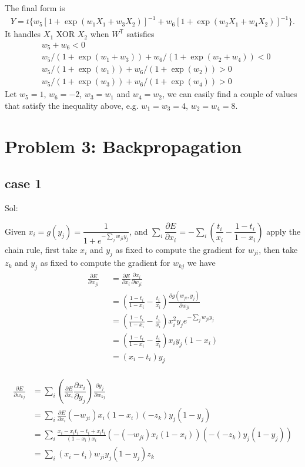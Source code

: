 \documentclass[a4paper,12pt]{article}
\begin{document}
The final form is 
\begin{align}
Y = t\{ w_5\left[1 + \exp(w_1 X_1 + w_3 X_2)\right]^{-1} + w_6\left[1 + \exp(w_2 X_1 + w_4 X_2)\right]^{-1} \}.  \nonumber
\end{align}
It handles $X_1$ XOR $X_2$ when $W^{\mathsf{T}}$ satisfies 
\begin{align}
&w_5+w_6 < 0 \\
&w_5 / (1+ \exp(w_1 + w_3)) + w_6 / (1+ \exp(w_2+ w_4)) < 0 \\
&w_5 / (1+ \exp(w_1 )) + w_6 / (1+ \exp(w_2))> 0 \\
&w_5 / (1+ \exp(w_3 )) + w_6 / (1+ \exp(w_4))> 0 
\end{align}
Let $w_5 = 1 $, $w_6 = -2$, $w_3 = w_1$ and $w_4 = w_2$, we can easily find a couple of values that satisfy the inequality above, e.g. $w_1 = w_3 = 4$, $w_2 = w_4 = 8$.

\section{Problem 3: Backpropagation}

\subsection{case 1}

Sol: 

Given $x_i = g(y_j) = \dfrac{1}{1+e^{-\sum_j {w_{ji}y_j}}}$, and $\sum_{i}\dfrac{\partial E}{\partial x_i} = -\sum_i {(\dfrac{t_i}{x_i} - \dfrac{1 - t_i}{1 - x_i})}$ apply the chain rule, first take $x_i$ and $y_j$ as fixed to compute the gradient for $w_{ji}$, then take $z_k$ and $y_j$ as fixed to compute the gradient for $w_{kj}$ we have 
\begin{align}
\frac{\partial E}{\partial w_{ji}} & = \frac{\partial E}{\partial x_i}\frac{\partial x_i}{\partial w_{ji}}\nonumber \\
&= (\frac{1-t_i}{1- x_i} - \frac{t_i}{x_i})\frac{\partial g(w_{ji}, y_j) }{\partial w_{ji}} \nonumber \\
& = (\frac{1-t_i}{1- x_i} - \frac{t_i}{x_i}) x^2_i y_{j} e^{-\sum_j{w_{ji}y_j}} \nonumber \\
& = (\frac{1-t_i}{1- x_i} - \frac{t_i}{x_i}) x_i y_{j} (1-x_i) \nonumber \\
& = (x_i - t_i) y_j \nonumber \\
\qquad \nonumber 
\end{align}

\begin{align}
\frac{\partial E}{\partial w_{kj}} & =  \sum_{i} (\frac{\partial E}{\partial x_i}  \dfrac{\partial x_i}{\partial y_j} )\frac{\partial y_j}{\partial w_{kj}} \nonumber \\
& =  \sum_{i} \frac{\partial E}{\partial x_i}(-w_{ji}) x_i (1 - x_i) (-z_k) y_j(1- y_j)\nonumber  \\
& = \sum_{i} \frac{x_i - x_i t_i - t_i + x_i t_i}{ (1-x_i)x_i } (-(-w_{ji}) x_i (1 - x_i))(- (-z_k) y_j(1- y_j)) \nonumber \\
& = \sum_{i} (x_i - t_i) w_{ji} y_j(1- y_j) z_k \nonumber 
\end{align}
\end{document}
